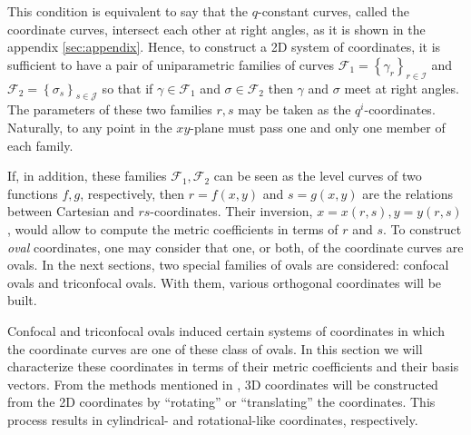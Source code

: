 \documentclass[12pt, ams, nofootinbib]{revtex4}
\newcommand{\cub}[1]{\left\{#1\right\}}  %
\theoremstyle{definition}
\begin{document}
This condition is equivalent to say that the $q$-constant curves, called the coordinate curves, intersect each other at right angles, as it is shown in the appendix \ref{sec:appendix}. Hence, to construct a 2D system of coordinates, it is sufficient to have a pair of uniparametric families of curves $\mathscr{F}_1=\cub{\gamma_r}_{r\in\mathcal{I}}$ and $\mathscr{F}_2 = \cub{\sigma_s}_{s\in\mathcal{J}}$ so that if $\gamma\in\mathscr{F}_1$ and $\sigma\in\mathscr{F}_2$ then $\gamma$ and $\sigma$ meet at right angles. The parameters of these two families $r,s$ may be taken as the $q^i$-coordinates. Naturally, to any point in the $xy$-plane must pass one and only one member of each family.

If, in addition, these families $\mathscr{F}_1,\mathscr{F}_2$ can be seen as the level curves of two functions $f,g$, respectively, then $r=f(x,y)$ and $s=g(x,y)$ are the relations between Cartesian and $rs$-coordinates. Their inversion, $x=x(r,s), y=y(r,s)$, would allow to compute the metric coefficients in terms of $r$ and $s$. To construct \textit{oval} coordinates, one may consider that one, or both, of the coordinate curves are ovals. In the next sections, two special families of ovals are considered: confocal ovals and triconfocal ovals. With them, various orthogonal coordinates will be built.


Confocal and triconfocal ovals induced certain systems of coordinates in which the coordinate curves are one of these class of ovals. In this section we will characterize these coordinates in terms of their metric coefficients and their basis vectors. From the methods mentioned in \cite{moon1988field}, 3D coordinates will be constructed from the 2D coordinates by ``rotating'' or ``translating'' the coordinates. This process results in cylindrical- and rotational-like coordinates, respectively. %
\end{document}
